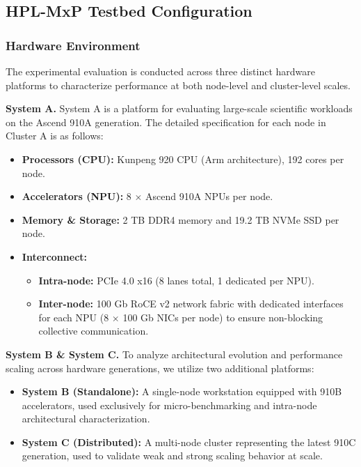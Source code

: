 \documentclass{article}
\begin{document}
\subsection{HPL-MxP Testbed Configuration}

\subsubsection{Hardware Environment}
The experimental evaluation is conducted across three distinct hardware platforms to characterize performance at both node-level and cluster-level scales.

\textbf{System A.}
System A is a platform for evaluating large-scale scientific workloads on the Ascend 910A generation. The detailed specification for each node in Cluster A is as follows:
\begin{itemize}
    \item \textbf{Processors (CPU):} Kunpeng 920 CPU (Arm architecture), 192 cores per node.
    \item \textbf{Accelerators (NPU):} 8 $\times$ Ascend 910A NPUs per node.
    \item \textbf{Memory \& Storage:} 2 TB DDR4 memory and 19.2 TB NVMe SSD per node.
    \item \textbf{Interconnect:}
    \begin{itemize}
        \item \textbf{Intra-node:} PCIe 4.0 x16 (8 lanes total, 1 dedicated per NPU).
        \item \textbf{Inter-node:} 100 Gb RoCE v2 network fabric with dedicated interfaces for each NPU (8 $\times$ 100 Gb NICs per node) to ensure non-blocking collective communication.
    \end{itemize}
\end{itemize}

\textbf{System B \& System C.}
To analyze architectural evolution and performance scaling across hardware generations, we utilize two additional platforms:
\begin{itemize}
    \item \textbf{System B (Standalone):} A single-node workstation equipped with 910B accelerators, used exclusively for micro-benchmarking and intra-node architectural characterization.
    \item \textbf{System C (Distributed):} A multi-node cluster representing the latest 910C generation, used to validate weak and strong scaling behavior at scale.
\end{itemize}
\end{document}
